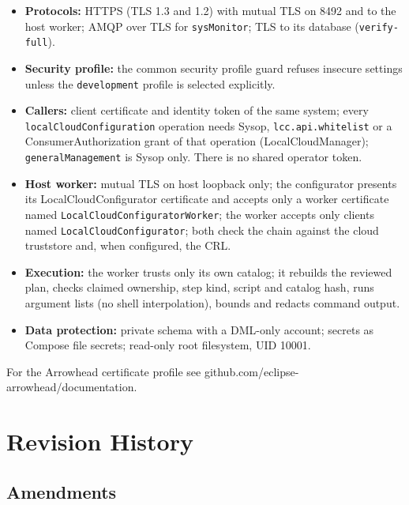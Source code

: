 \documentclass[a4paper]{arrowhead}
\begin{document}
\begin{itemize}
  \item \textbf{Protocols:} HTTPS (TLS 1.3 and 1.2) with mutual TLS on 8492 and to the host worker; AMQP over TLS for \texttt{sysMonitor}; TLS to its database (\texttt{verify-\allowbreak{}full}).
  \item \textbf{Security profile:} the common security profile guard refuses insecure settings unless the \texttt{development} profile is selected explicitly.
  \item \textbf{Callers:} client certificate and identity token of the same system; every \texttt{local\allowbreak{}Cloud\allowbreak{}Configuration} operation needs Sysop, \texttt{lcc.\allowbreak{}api.\allowbreak{}whitelist} or a ConsumerAuthorization grant of that operation (LocalCloudManager); \texttt{general\allowbreak{}Management} is Sysop only. There is no shared operator token.
  \item \textbf{Host worker:} mutual TLS on host loopback only; the configurator presents its LocalCloudConfigurator certificate and accepts only a worker certificate named \texttt{LocalCloudConfiguratorWorker}; the worker accepts only clients named \texttt{LocalCloudConfigurator}; both check the chain against the cloud truststore and, when configured, the CRL.
  \item \textbf{Execution:} the worker trusts only its own catalog; it rebuilds the reviewed plan, checks claimed ownership, step kind, script and catalog hash, runs argument lists (no shell interpolation), bounds and redacts command output.
  \item \textbf{Data protection:} private schema with a DML-only account; secrets as Compose file secrets; read-only root filesystem, UID 10001.
\end{itemize}

For the Arrowhead certificate profile see github.com/eclipse-arrowhead/documentation.





\newpage

\section{Revision History}
\subsection{Amendments}
\end{document}
